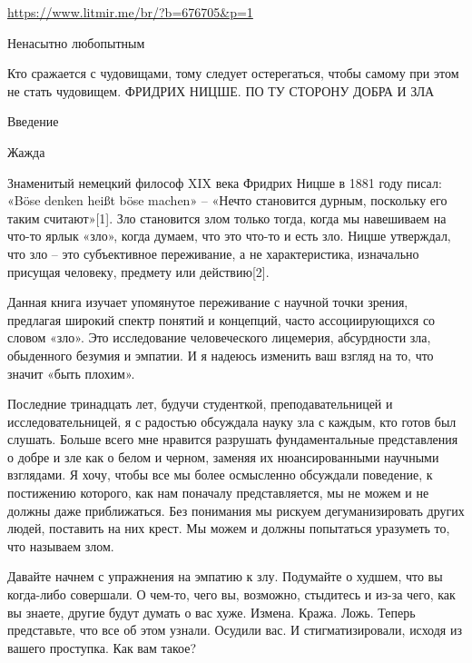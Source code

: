  
 
 
 
 

\url{https://www.litmir.me/br/?b=676705&p=1}

Ненасытно любопытным

Кто сражается с чудовищами, тому следует остерегаться, чтобы самому при этом не стать чудовищем.
ФРИДРИХ НИЦШЕ. ПО ТУ СТОРОНУ ДОБРА И ЗЛА

Введение

Жажда

Знаменитый немецкий философ XIX века Фридрих Ницше в 1881 году писал: «Böse
denken heißt böse machen» – «Нечто становится дурным, поскольку его таким
считают»[1]. Зло становится злом только тогда, когда мы навешиваем на что-то
ярлык «зло», когда думаем, что это что-то и есть зло. Ницше утверждал, что зло
– это субъективное переживание, а не характеристика, изначально присущая
человеку, предмету или действию[2].

Данная книга изучает упомянутое переживание с научной точки зрения, предлагая
широкий спектр понятий и концепций, часто ассоциирующихся со словом «зло». Это
исследование человеческого лицемерия, абсурдности зла, обыденного безумия и
эмпатии. И я надеюсь изменить ваш взгляд на то, что значит «быть плохим».

Последние тринадцать лет, будучи студенткой, преподавательницей и
исследовательницей, я с радостью обсуждала науку зла с каждым, кто готов был
слушать. Больше всего мне нравится разрушать фундаментальные представления о
добре и зле как о белом и черном, заменяя их нюансированными научными
взглядами. Я хочу, чтобы все мы более осмысленно обсуждали поведение, к
постижению которого, как нам поначалу представляется, мы не можем и не должны
даже приближаться. Без понимания мы рискуем дегуманизировать других людей,
поставить на них крест. Мы можем и должны попытаться уразуметь то, что называем
злом.

Давайте начнем с упражнения на эмпатию к злу. Подумайте о худшем, что вы
когда-либо совершали. О чем-то, чего вы, возможно, стыдитесь и из-за чего, как
вы знаете, другие будут думать о вас хуже. Измена. Кража. Ложь. Теперь
представьте, что все об этом узнали. Осудили вас. И стигматизировали, исходя из
вашего проступка. Как вам такое?

